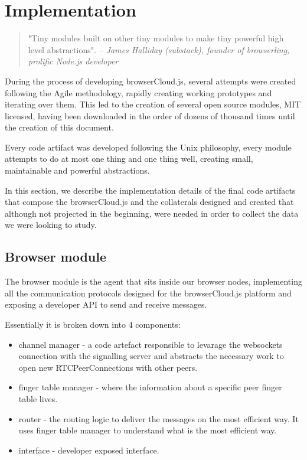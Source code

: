 \chapter{Implementation}\label{ch:implemenation}

\begin{quotation}
"Tiny modules built on other tiny modules to make tiny powerful high level abstractions".
{\small\it -- James Halliday (substack), founder of browserling, prolific Node.js developer}
\end{quotation}

During the process of developing browserCloud.js, several attempts were created following the Agile methodology, rapidly creating working prototypes and iterating over them. This led to the creation of several open source modules, MIT licensed, having been downloaded in the order of dozens of thousand times until the creation of this document.

Every code artifact was developed following the Unix philosophy, every module attempts to do at most one thing and one thing well, creating small, maintainable and powerful abstractions.

In this section, we describe the implementation details of the final code artifacts that compose the browserCloud.js and the collaterals designed and created that although not projected in the beginning, were needed in order to collect the data we were looking to study.

\section{Browser module}

The browser module is the agent that sits inside our browser nodes, implementing all the communication protocols designed for the browserCloud.js platform and exposing a developer API to send and receive messages.

Essentially it is broken down into 4 components:

\begin{itemize}
    \item channel manager - a code artefact responsible to levarage the websockets connection with the signalling server and abstracts the necessary work to open new RTCPeerConnections with other peers.
    \item finger table manager - where the information about a specific peer finger table lives.
    \item router - the routing logic to deliver the messages on the most efficient way. It uses finger table manager to understand what is the most efficient way.
    \item interface - developer exposed interface.
\end{itemize}

